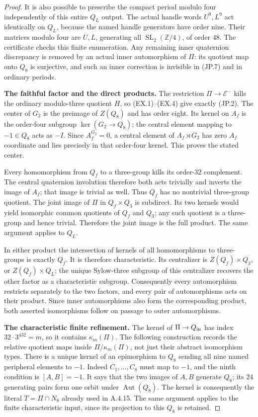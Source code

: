 \begin{proof}
It is also possible to prescribe the compact period modulo
four independently of this entire $Q_L$ output.  The actual
handle words $U^9,L^9$ act identically on $Q_L$, because the
named handle generators have order nine.  Their matrices
modulo four are $U,L$, generating all
$\operatorname{SL}_2(\mathbb Z/4)$, of order $48$.
The certificate checks this finite enumeration.  Any remaining
inner quaternion discrepancy is removed by an actual inner
automorphism of $\Pi$: its quotient map onto $Q_8$ is surjective,
and such an inner correction is invisible in (JP.7) and in
ordinary periods.

\par\medskip\noindent\textbf{The faithful factor and the direct products.}\quad
The restriction $\Pi\to\mathcal E^-$ kills the ordinary
modulo-three quotient $H$, so (EX.1)--(EX.4) give exactly (JP.2).
The center of $G_2$ is the preimage of $Z(Q_8)$ and has order
eight.  Its kernel on $A_f$ is the order-four subgroup
$\ker(G_2\to Q_8)$; the central element mapping to $-1\in Q_8$
acts as $-I$.  Since $A_f^{G_2}=0$, a central element of
$A_f\rtimes G_2$ has zero $A_f$ coordinate and lies precisely
in that order-four kernel.  This proves the stated center.

Every homomorphism from $Q_f$ to a three-group kills its
order-$32$ complement.  The central quaternion involution
therefore both acts trivially and inverts the image of $A_f$;
that image is trivial as well.  Thus $Q_f$ has no nontrivial
three-group quotient.  The joint image of $\Pi$ in $Q_f\times Q_3$
is subdirect.  Its two kernels would yield isomorphic common
quotients of $Q_f$ and $Q_3$; any such quotient is a three-group
and hence trivial.  Therefore the joint image is the full
product.  The same argument applies to $Q_L$.

In either product the intersection of kernels of all
homomorphisms to three-groups is exactly $Q_f$.  It is therefore
characteristic.  Its centralizer is $Z(Q_f)\times Q_3$, or
$Z(Q_f)\times Q_L$; the unique Sylow-three subgroup of this
centralizer recovers the other factor as a characteristic subgroup.
Consequently every automorphism restricts separately to the
two factors, and every pair of automorphisms acts on their
product.  Since inner automorphisms also form the corresponding
product, both asserted isomorphisms follow on passage to outer
automorphisms.

\par\medskip\noindent\textbf{The characteristic finite refinement.}\quad
The kernel of $\Pi\to Q_{\rm in}$ has index
$32\cdot3^{432}=m$, so it contains $\kappa_m(\Pi)$.
The following construction records the relative quotient maps
inside $\Pi/\kappa_m(\Pi)$, not just their abstract isomorphism
types.  There is a unique kernel of an epimorphism to $Q_8$
sending all nine named peripheral elements to $-1$.  Indeed
$C_1,\ldots,C_8$ must map to $-1$, and the ninth condition is
$[A,B]=-1$.  It says that the two images of $A,B$ generate
$Q_8$; its $24$ generating pairs form one orbit under
$\operatorname{Aut}(Q_8)$.  The kernel is consequently the
literal $T=\Pi\cap N_8$ already used in A.4.15.
The same argument applies to the finite characteristic input,
since its projection to this $Q_8$ is retained.


\end{proof}
